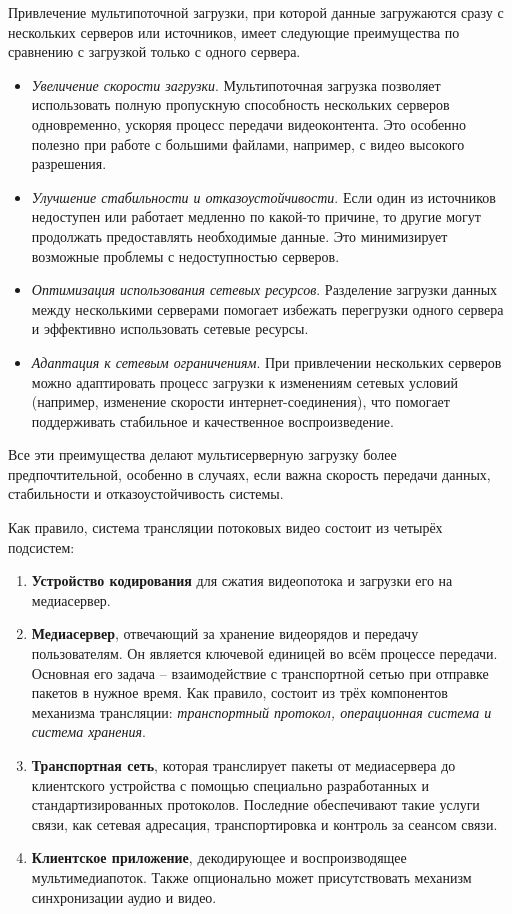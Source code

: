 Привлечение мультипоточной загрузки, при которой данные загружаются сразу с нескольких серверов или источников, имеет следующие преимущества по сравнению с загрузкой только с одного сервера.
\begin{itemize}
	\item \textit{Увеличение скорости загрузки}. Мультипоточная загрузка позволяет использовать полную пропускную способность нескольких серверов одновременно, ускоряя процесс передачи видеоконтента. Это особенно полезно при работе с большими файлами, например, с видео высокого разрешения.
	
	\item \textit{Улучшение стабильности и отказоустойчивости}. Если один из источников недоступен или работает медленно по какой-то причине, то другие могут продолжать предоставлять необходимые данные. Это минимизирует возможные проблемы с недоступностью серверов.
	
	\item \textit{Оптимизация использования сетевых ресурсов}. Разделение загрузки данных между несколькими серверами помогает избежать перегрузки одного сервера и эффективно использовать сетевые ресурсы.
	
	\item \textit{Адаптация к сетевым ограничениям}. При привлечении нескольких серверов можно адаптировать процесс загрузки к изменениям сетевых условий (например, изменение скорости интернет-соединения), что помогает поддерживать стабильное и качественное воспроизведение. 
\end{itemize}

Все эти преимущества делают мультисерверную загрузку более предпочтительной, особенно в случаях, если важна скорость передачи данных, стабильности и отказоустойчивость системы.

Как правило, система трансляции потоковых видео состоит из четырёх подсистем:
\begin{enumerate}
	\item \textbf{Устройство кодирования} для сжатия видеопотока и загрузки его на медиасервер. 
	
	\item \textbf{Медиасервер}, отвечающий за хранение видеорядов и передачу пользователям. Он является ключевой единицей во всём процессе передачи. Основная его задача -- взаимодействие с транспортной сетью при отправке пакетов в нужное время. Как правило, состоит из трёх компонентов механизма трансляции: \textit{транспортный протокол, операционная система и система хранения}.
	
	\item \textbf{Транспортная сеть}, которая транслирует пакеты от медиасервера до клиентского устройства с помощью специально разработанных и стандартизированных протоколов. Последние обеспечивают такие услуги связи, как сетевая адресация, транспортировка и контроль за сеансом связи.
	
	\item \textbf{Клиентское приложение}, декодирующее и воспроизводящее мультимедиапоток. Также опционально может присутствовать механизм синхронизации аудио и видео.
\end{enumerate}


